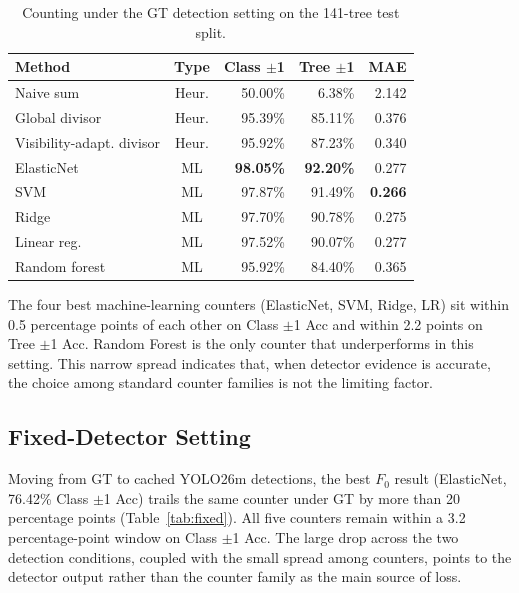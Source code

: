 ﻿\documentclass[conference]{IEEEtran}
\begin{document}
\begin{table}[!htbp]
  \centering
  \scriptsize
  \setlength{\tabcolsep}{2.3pt}
  \caption{Counting under the GT detection setting on the 141-tree test split.}
  \label{tab:gt}
  \begin{tabular}{@{}lcrrr@{}}
    \toprule
    Method                      & Type  & Class $\pm$1 & Tree $\pm$1 & MAE            \\
    \midrule
    Naive sum                   & Heur. & 50.00\%          &  6.38\%     & 2.142          \\
    Global divisor              & Heur. & 95.39\%          & 85.11\%     & 0.376          \\
    Visibility-adapt. divisor   & Heur. & 95.92\%          & 87.23\%     & 0.340          \\
    ElasticNet                  & ML    & \textbf{98.05\%} & \textbf{92.20\%} & 0.277      \\
    SVM                         & ML    & 97.87\%          & 91.49\%     & \textbf{0.266} \\
    Ridge                       & ML    & 97.70\%          & 90.78\%     & 0.275          \\
    Linear reg.                 & ML    & 97.52\%          & 90.07\%     & 0.277          \\
    Random forest               & ML    & 95.92\%          & 84.40\%     & 0.365          \\
    \bottomrule
  \end{tabular}
\end{table}

The four best machine-learning counters (ElasticNet, SVM, Ridge, LR) sit within
0.5 percentage points of each other on Class $\pm$1 Acc and within 2.2 points
on Tree $\pm$1 Acc. Random Forest is the only counter that underperforms in this
setting. This narrow spread indicates that, when detector evidence is accurate,
the choice among standard counter families is not the limiting factor.

\subsection{Fixed-Detector Setting}
\label{sec:fixed}

Moving from GT to cached YOLO26m detections, the best $F_0$ result
(ElasticNet, 76.42\% Class $\pm$1 Acc) trails the same counter under GT by
more than 20 percentage points (Table~\ref{tab:fixed}). All five counters
remain within a 3.2 percentage-point window on Class $\pm$1 Acc. The large
drop across the two detection conditions, coupled with the small spread among
counters, points to the detector output rather than the counter family as the
main source of loss.
\end{document}
